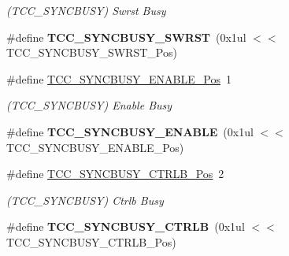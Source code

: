 \begin{DoxyCompactItemize}
\begin{DoxyCompactList}\small\item\em (T\+C\+C\+\_\+\+S\+Y\+N\+C\+B\+U\+S\+Y) Swrst Busy \end{DoxyCompactList}\item 
\hypertarget{group___s_a_m_l21___t_c_c_gaeb1d5fecb9fa5b651056977eb3232b87}{}\#define {\bfseries T\+C\+C\+\_\+\+S\+Y\+N\+C\+B\+U\+S\+Y\+\_\+\+S\+W\+R\+S\+T}~(0x1ul $<$$<$ T\+C\+C\+\_\+\+S\+Y\+N\+C\+B\+U\+S\+Y\+\_\+\+S\+W\+R\+S\+T\+\_\+\+Pos)\label{group___s_a_m_l21___t_c_c_gaeb1d5fecb9fa5b651056977eb3232b87}

\item 
\hypertarget{group___s_a_m_l21___t_c_c_ga9a7f072e575b87132d02c8b002dd05b8}{}\#define \hyperlink{group___s_a_m_l21___t_c_c_ga9a7f072e575b87132d02c8b002dd05b8}{T\+C\+C\+\_\+\+S\+Y\+N\+C\+B\+U\+S\+Y\+\_\+\+E\+N\+A\+B\+L\+E\+\_\+\+Pos}~1\label{group___s_a_m_l21___t_c_c_ga9a7f072e575b87132d02c8b002dd05b8}

\begin{DoxyCompactList}\small\item\em (T\+C\+C\+\_\+\+S\+Y\+N\+C\+B\+U\+S\+Y) Enable Busy \end{DoxyCompactList}\item 
\hypertarget{group___s_a_m_l21___t_c_c_ga9b606711a391f443eed1b3a13fb5f50e}{}\#define {\bfseries T\+C\+C\+\_\+\+S\+Y\+N\+C\+B\+U\+S\+Y\+\_\+\+E\+N\+A\+B\+L\+E}~(0x1ul $<$$<$ T\+C\+C\+\_\+\+S\+Y\+N\+C\+B\+U\+S\+Y\+\_\+\+E\+N\+A\+B\+L\+E\+\_\+\+Pos)\label{group___s_a_m_l21___t_c_c_ga9b606711a391f443eed1b3a13fb5f50e}

\item 
\hypertarget{group___s_a_m_l21___t_c_c_ga222a7623e15823d0481240307517498f}{}\#define \hyperlink{group___s_a_m_l21___t_c_c_ga222a7623e15823d0481240307517498f}{T\+C\+C\+\_\+\+S\+Y\+N\+C\+B\+U\+S\+Y\+\_\+\+C\+T\+R\+L\+B\+\_\+\+Pos}~2\label{group___s_a_m_l21___t_c_c_ga222a7623e15823d0481240307517498f}

\begin{DoxyCompactList}\small\item\em (T\+C\+C\+\_\+\+S\+Y\+N\+C\+B\+U\+S\+Y) Ctrlb Busy \end{DoxyCompactList}\item 
\hypertarget{group___s_a_m_l21___t_c_c_ga9a13a4f4798e538842f774e064c625b1}{}\#define {\bfseries T\+C\+C\+\_\+\+S\+Y\+N\+C\+B\+U\+S\+Y\+\_\+\+C\+T\+R\+L\+B}~(0x1ul $<$$<$ T\+C\+C\+\_\+\+S\+Y\+N\+C\+B\+U\+S\+Y\+\_\+\+C\+T\+R\+L\+B\+\_\+\+Pos)\label{group___s_a_m_l21___t_c_c_ga9a13a4f4798e538842f774e064c625b1}


\end{DoxyCompactItemize}
